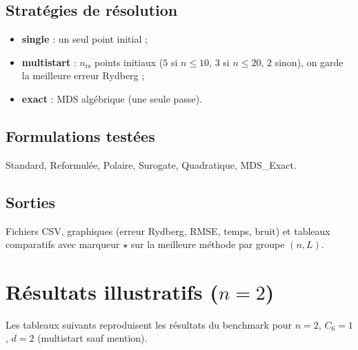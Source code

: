\documentclass[12pt,a4paper]{article}
\begin{document}
\subsection{Stratégies de résolution}

\begin{itemize}[leftmargin=2em]
  \item \textbf{single} : un seul point initial ;
  \item \textbf{multistart} : $n_{\mathrm{rs}}$ points initiaux
    ($5$ si $n\leq 10$, $3$ si $n\leq 20$, $2$ sinon),
    on garde la meilleure erreur Rydberg ;
  \item \textbf{exact} : MDS algébrique (une seule passe).
\end{itemize}

\subsection{Formulations testées}

Standard, Reformulée, Polaire, Surogate, Quadratique, MDS\_Exact.

\subsection{Sorties}

Fichiers CSV, graphiques (erreur Rydberg, RMSE, temps, bruit) et tableaux
comparatifs avec marqueur $\star$ sur la meilleure méthode par groupe $(n, L)$.

\section{Résultats illustratifs ($n=2$)}

Les tableaux suivants reproduisent les résultats du benchmark pour $n=2$,
$C_6=1$, $d=2$ (multistart sauf mention).
\end{document}
